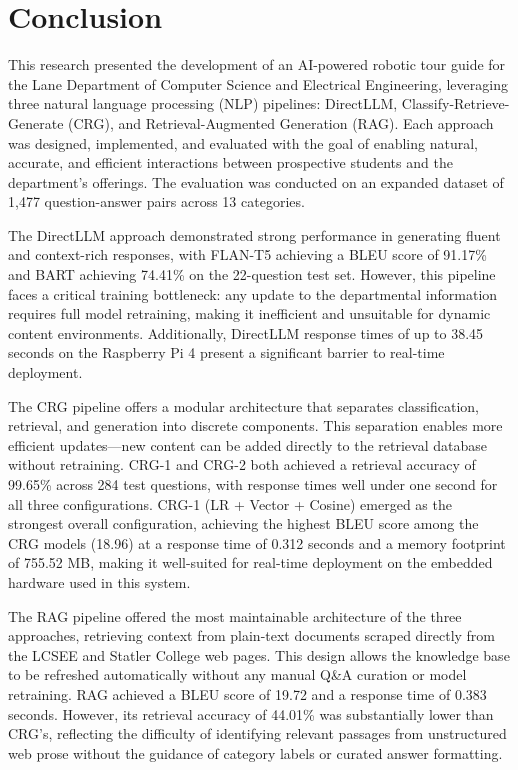 \documentclass[conference]{IEEEtran}
\begin{document}
\section{Conclusion}
This research presented the development of an AI-powered robotic tour guide for the Lane Department of Computer Science and Electrical Engineering, leveraging three natural language processing (NLP) pipelines: DirectLLM, Classify-Retrieve-Generate (CRG), and Retrieval-Augmented Generation (RAG). 
Each approach was designed, implemented, and evaluated with the goal of enabling natural, accurate, and efficient interactions between prospective students and the department's offerings.
The evaluation was conducted on an expanded dataset of 1,477 question-answer pairs across 13 categories.

The DirectLLM approach demonstrated strong performance in generating fluent and context-rich responses, with FLAN-T5 achieving a BLEU score of 91.17\% and BART achieving 74.41\% on the 22-question test set. 
However, this pipeline faces a critical training bottleneck: any update to the departmental information requires full model retraining, making it inefficient and unsuitable for dynamic content environments. 
Additionally, DirectLLM response times of up to 38.45 seconds on the Raspberry Pi 4 present a significant barrier to real-time deployment.

The CRG pipeline offers a modular architecture that separates classification, retrieval, and generation into discrete components. 
This separation enables more efficient updates---new content can be added directly to the retrieval database without retraining. 
CRG-1 and CRG-2 both achieved a retrieval accuracy of 99.65\% across 284 test questions, with response times well under one second for all three configurations.
CRG-1 (LR + Vector + Cosine) emerged as the strongest overall configuration, achieving the highest BLEU score among the CRG models (18.96) at a response time of 0.312 seconds and a memory footprint of 755.52 MB, making it well-suited for real-time deployment on the embedded hardware used in this system.

The RAG pipeline offered the most maintainable architecture of the three approaches, retrieving context from plain-text documents scraped directly from the LCSEE and Statler College web pages.
This design allows the knowledge base to be refreshed automatically without any manual Q\&A curation or model retraining.
RAG achieved a BLEU score of 19.72 and a response time of 0.383 seconds.
However, its retrieval accuracy of 44.01\% was substantially lower than CRG's, reflecting the difficulty of identifying relevant passages from unstructured web prose without the guidance of category labels or curated answer formatting.
\end{document}
